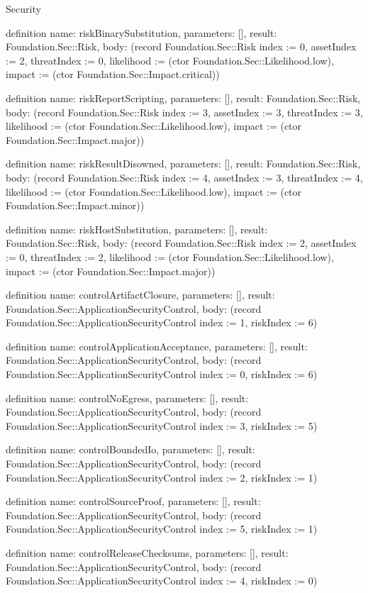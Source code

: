 \begin{lexlean}{Security}
\begin{semanticmodule}
definition{
  name: riskBinarySubstitution,
  parameters: [],
  result: Foundation.Sec::Risk,
  body: (record Foundation.Sec::Risk {index := 0, assetIndex := 2, threatIndex := 0, likelihood := (ctor Foundation.Sec::Likelihood.low), impact := (ctor Foundation.Sec::Impact.critical)})
}

definition{
  name: riskReportScripting,
  parameters: [],
  result: Foundation.Sec::Risk,
  body: (record Foundation.Sec::Risk {index := 3, assetIndex := 3, threatIndex := 3, likelihood := (ctor Foundation.Sec::Likelihood.low), impact := (ctor Foundation.Sec::Impact.major)})
}

definition{
  name: riskResultDisowned,
  parameters: [],
  result: Foundation.Sec::Risk,
  body: (record Foundation.Sec::Risk {index := 4, assetIndex := 3, threatIndex := 4, likelihood := (ctor Foundation.Sec::Likelihood.low), impact := (ctor Foundation.Sec::Impact.minor)})
}

definition{
  name: riskHostSubstitution,
  parameters: [],
  result: Foundation.Sec::Risk,
  body: (record Foundation.Sec::Risk {index := 2, assetIndex := 0, threatIndex := 2, likelihood := (ctor Foundation.Sec::Likelihood.low), impact := (ctor Foundation.Sec::Impact.major)})
}

definition{
  name: controlArtifactClosure,
  parameters: [],
  result: Foundation.Sec::ApplicationSecurityControl,
  body: (record Foundation.Sec::ApplicationSecurityControl {index := 1, riskIndex := 6})
}

definition{
  name: controlApplicationAcceptance,
  parameters: [],
  result: Foundation.Sec::ApplicationSecurityControl,
  body: (record Foundation.Sec::ApplicationSecurityControl {index := 0, riskIndex := 6})
}

definition{
  name: controlNoEgress,
  parameters: [],
  result: Foundation.Sec::ApplicationSecurityControl,
  body: (record Foundation.Sec::ApplicationSecurityControl {index := 3, riskIndex := 5})
}

definition{
  name: controlBoundedIo,
  parameters: [],
  result: Foundation.Sec::ApplicationSecurityControl,
  body: (record Foundation.Sec::ApplicationSecurityControl {index := 2, riskIndex := 1})
}

definition{
  name: controlSourceProof,
  parameters: [],
  result: Foundation.Sec::ApplicationSecurityControl,
  body: (record Foundation.Sec::ApplicationSecurityControl {index := 5, riskIndex := 1})
}

definition{
  name: controlReleaseChecksums,
  parameters: [],
  result: Foundation.Sec::ApplicationSecurityControl,
  body: (record Foundation.Sec::ApplicationSecurityControl {index := 4, riskIndex := 0})
}


\end{semanticmodule}
\end{lexlean}
